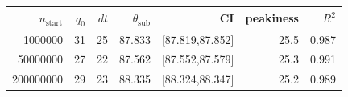 \begin{tabular}{r r r r r r r}
\hline
$n_{\mathrm{start}}$ & $q_0$ & $dt$ & $\theta_{\mathrm{sub}}$ & CI & peakiness & $R^2$ \\
\hline
1000000 & 31 & 25 & 87.833 & [87.819,87.852] & 25.5 & 0.987 \\
50000000 & 27 & 22 & 87.562 & [87.552,87.579] & 25.3 & 0.991 \\
200000000 & 29 & 23 & 88.335 & [88.324,88.347] & 25.2 & 0.989 \\
\hline
\end{tabular}
